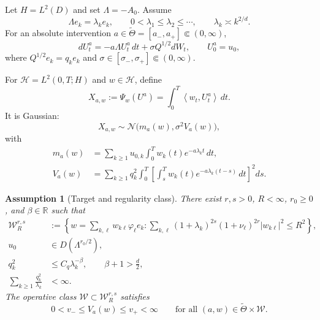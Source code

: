 \documentclass[11pt]{article}
\newtheorem{assumption}{Assumption}[section]
\theoremstyle{remark}
\newcommand{\R}{\mathbb R}
\newcommand{\cH}{\mathcal H}
\newcommand{\cW}{\mathcal W}
\newcommand{\ip}[2]{\left\langle #1,#2\right\rangle}
\newcommand{\Lam}{\Lambda}
\begin{document}
Let $H=L^2(D)$ and set $\Lam=-A_0$. Assume
\begin{equation}\label{eq:spectrum}
 \Lam e_k=\lambda_ke_k,
 \qquad
 0<\lambda_1\le\lambda_2\le\cdots,
 \qquad
 \lambda_k\asymp k^{2/d}.
\end{equation}
For an absolute intervention $a\in\widetilde\Theta=[a_-,a_+]\Subset(0,\infty)$,
\begin{equation}\label{eq:spde}
 dU_t^a=-a\Lam U_t^a\,dt+\sigma Q^{1/2}dW_t,
 \qquad U_0^a=u_0,
\end{equation}
where $Q^{1/2}e_k=q_ke_k$ and $\sigma\in[\sigma_-,\sigma_+]\Subset(0,\infty)$.

For $\cH=L^2(0,T;H)$ and $w\in\cH$, define
\begin{equation}\label{eq:X}
 X_{a,w}:=\Psi_w(U^a)
 =\int_0^T\ip{w_t}{U_t^a}\,dt.
\end{equation}
It is Gaussian:
\begin{equation}\label{eq:law}
 X_{a,w}\sim
 \mathcal N\big(m_a(w),\sigma^2V_a(w)\big),
\end{equation}
with
\begin{align}
 m_a(w)
 &=\sum_{k\ge1}u_{0,k}\int_0^T w_k(t)e^{-a\lambda_kt}\,dt,
 \label{eq:mean}\\
 V_a(w)
 &=\sum_{k\ge1}q_k^2\int_0^T
 \left[
 \int_s^T w_k(t)e^{-a\lambda_k(t-s)}\,dt
 \right]^2ds.
 \label{eq:variance}
\end{align}

\begin{assumption}[Target and regularity class]\label{ass:class}
There exist $r,s>0$, $R<\infty$, $r_0\ge0$, and $\beta\in\R$ such that
\begin{align}
 \cW_R^{r,s}
 &:={\left\{
 w=\sum_{k,\ell}w_{k\ell}\varphi_\ell e_k:
 \sum_{k,\ell}
 (1+\lambda_k)^{2s}(1+\nu_\ell)^{2r}
 |w_{k\ell}|^2\le R^2
 \right\}},
 \label{eq:ellipsoid}\\
 u_0&\in D(\Lam^{r_0/2}),\label{eq:u0}\\
 q_k^2&\le C_q\lambda_k^{-\beta},
 \qquad \beta+1>\frac d2,\label{eq:qdecay}\\
 \sum_{k\ge1}\frac{q_k^2}{\lambda_k}&<\infty.\label{eq:baseline-noise}
\end{align}
The operative class $\cW\subset\cW_R^{r,s}$ satisfies
\begin{equation}\label{eq:variance-lower}
 0<v_-\le V_a(w)\le v_+<\infty
 \qquad
 \text{for all }(a,w)\in\widetilde\Theta\times\cW.
\end{equation}
\end{assumption}
\end{document}
